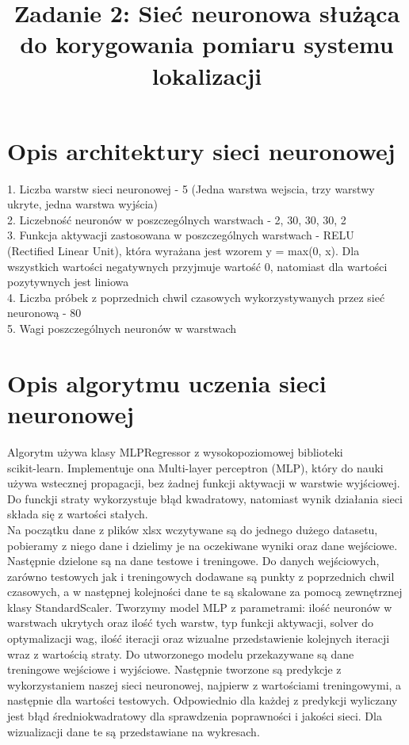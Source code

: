\documentclass{classrep}
\author{
  \studentinfo{Maciej Pracucik}{216869} \and
  \studentinfo{Adam Jóźwiak}{216786}
}
\title{\textbf{Zadanie 2: Sieć neuronowa służąca do korygowania pomiaru systemu lokalizacji}}
\begin{document}
\maketitle

\section{Opis architektury sieci neuronowej}
{
	1. Liczba warstw sieci neuronowej - 5 (Jedna warstwa wejscia, trzy warstwy ukryte, jedna warstwa wyjścia) \\
	2. Liczebność neuronów w poszczególnych warstwach - 2, 30, 30, 30, 2 \\
	3. Funkcja aktywacji zastosowana w poszczególnych warstwach - RELU \\ (Rectified Linear Unit), która wyrażana jest wzorem y = max(0, x). Dla wszystkich wartości negatywnych przyjmuje wartość 0, natomiast dla wartości pozytywnych jest liniowa \\
	4. Liczba próbek z poprzednich chwil czasowych wykorzystywanych przez sieć neuronową - 80 \\
	5. Wagi poszczególnych neuronów w warstwach \\
 }

\section{Opis algorytmu uczenia sieci neuronowej}
{
	Algorytm używa klasy MLPRegressor z wysokopoziomowej biblioteki \\scikit-learn. Implementuje ona Multi-layer perceptron (MLP), który do nauki używa wstecznej propagacji, bez żadnej 
	funkcji aktywacji w warstwie wyjściowej. Do funckji straty wykorzystuje błąd kwadratowy, natomiast wynik działania sieci składa się z wartości stałych. \\
	Na początku dane z plików xlsx wczytywane są do jednego dużego datasetu, pobieramy z niego dane i dzielimy je na oczekiwane wyniki oraz dane wejściowe.
	Następnie dzielone są na dane testowe i treningowe.
	Do danych wejściowych, zarówno testowych jak i treningowych dodawane są punkty z poprzednich chwil czasowych, a w następnej kolejności dane te są skalowane za pomocą zewnętrznej klasy StandardScaler. Tworzymy model MLP z parametrami: ilość neuronów w warstwach ukrytych oraz ilość tych warstw, typ funkcji aktywacji, solver do optymalizacji wag, ilość iteracji oraz wizualne 		przedstawienie kolejnych iteracji wraz z wartością straty. Do utworzonego modelu przekazywane są dane treningowe wejściowe i wyjściowe. Następnie tworzone są predykcje z wykorzystaniem naszej sieci neuronowej, najpierw z wartościami treningowymi, a następnie dla wartości testowych. Odpowiednio dla  każdej z predykcji wyliczany jest błąd średniokwadratowy dla sprawdzenia 			poprawności i jakości sieci. Dla wizualizacji dane te są przedstawiane na wykresach.
}
\end{document}
